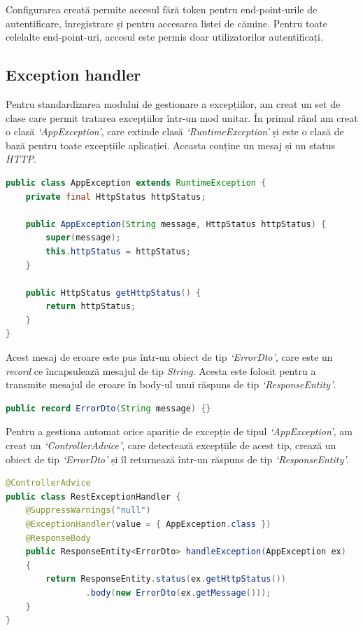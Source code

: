 \documentclass[12pt,a4paper]{report}
\theoremstyle{definition}
\theoremstyle{remark}
\begin{document}
\par Configurarea creată permite accesul fără token pentru end-point-urile de autentificare, înregistrare și pentru accesarea listei de cămine. Pentru toate celelalte end-point-uri, accesul este permis doar utilizatorilor autentificați.
\subsection{Exception handler}

\par Pentru standardizarea modului de gestionare a excepțiilor, am creat un set de clase care permit tratarea excepțiilor într-un mod unitar. În primul rând am creat o clasă \textit{`AppException'}, care extinde clasă \textit{`RuntimeException'} și este o clasă de bază pentru toate excepțiile aplicației. Aceasta conține un mesaj și un status \textit{HTTP}.

\begin{lstlisting}[language=Java, caption={Clasa de bază pentru excepții}]
public class AppException extends RuntimeException {
    private final HttpStatus httpStatus;

    public AppException(String message, HttpStatus httpStatus) {
        super(message);
        this.httpStatus = httpStatus;
    }

    public HttpStatus getHttpStatus() {
        return httpStatus;
    }
}
\end{lstlisting}

\par Acest mesaj de eroare este pus într-un obiect de tip \textit{`ErrorDto'}, care este un \textit{record}\cite{baeldung_java_vs_final_class} ce încapsulează mesajul de tip \textit{String}. Acesta este folosit pentru a transmite mesajul de eroare în body-ul unui răspuns de tip \textit{`ResponseEntity'}.

\begin{lstlisting}[language=Java, caption={Record pentru mesaje de eroare}]
public record ErrorDto(String message) {}
\end{lstlisting}

\par Pentru a gestiona automat orice apariție de excepție de tipul \textit{`AppException'}, am creat un \textit{`ControllerAdvice'}, care detectează excepțiile de acest tip, crează un obiect de tip \textit{`ErrorDto'} și îl returnează într-un răspuns de tip \textit{`ResponseEntity'}.

\begin{lstlisting}[language=Java, caption={Clasă care gestionează excepțiile apărute}]
@ControllerAdvice
public class RestExceptionHandler {
    @SuppressWarnings("null")
    @ExceptionHandler(value = { AppException.class })
    @ResponseBody
    public ResponseEntity<ErrorDto> handleException(AppException ex)
    {
        return ResponseEntity.status(ex.getHttpStatus())
                .body(new ErrorDto(ex.getMessage()));
    }
}
\end{lstlisting}
\end{document}
